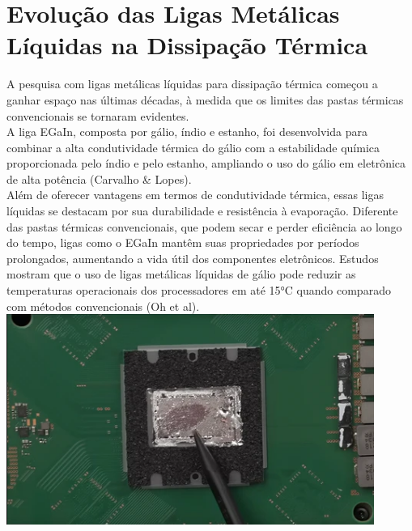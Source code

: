 \documentclass[12pt]{article}
\begin{document}
\section{Evolução das Ligas Metálicas Líquidas na Dissipação Térmica}
A pesquisa com ligas metálicas líquidas para dissipação térmica começou a ganhar espaço nas últimas décadas, à medida que os limites das pastas térmicas convencionais se tornaram evidentes. \\
A liga EGaIn, composta por gálio, índio e estanho, foi desenvolvida para combinar a alta condutividade térmica do gálio com a estabilidade química proporcionada pelo índio e pelo estanho, ampliando o uso do gálio em eletrônica de alta potência (Carvalho \& Lopes).\\
Além de oferecer vantagens em termos de condutividade térmica, essas ligas líquidas se destacam por sua durabilidade e resistência à evaporação. Diferente das pastas térmicas convencionais, que podem secar e perder eficiência ao longo do tempo, ligas como o EGaIn mantêm suas propriedades por períodos prolongados, aumentando a vida útil dos componentes eletrônicos. Estudos mostram que o uso de ligas metálicas líquidas de gálio pode reduzir as temperaturas operacionais dos processadores em até 15°C quando comparado com métodos convencionais (Oh et al).\\
\begin{adjustbox}{center,caption={Chip que utiliza metal liquido como interface termica},nofloat=figure,vspace=\bigskipamount}
    \centering
    \includegraphics[width=12cm]{chip.png}
\end{adjustbox}
\end{document}
